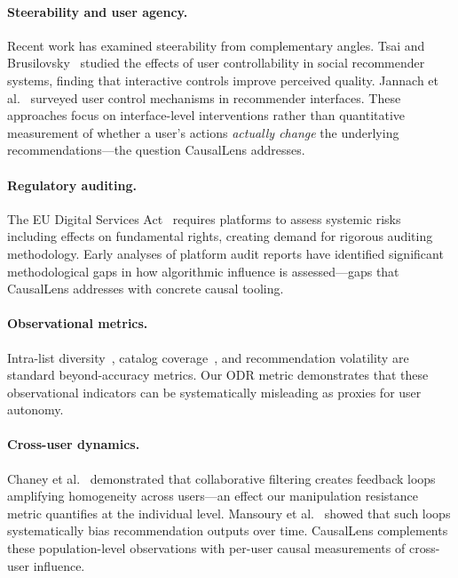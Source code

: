 \documentclass[sigconf,anonymous]{acmart}
\begin{document}
\paragraph{Steerability and user agency.}
Recent work has examined steerability from complementary angles. Tsai and Brusilovsky~\cite{tsai2021controllability} studied the effects of user controllability in social recommender systems, finding that interactive controls improve perceived quality. Jannach et al.~\cite{jannach2017user} surveyed user control mechanisms in recommender interfaces. These approaches focus on interface-level interventions rather than quantitative measurement of whether a user's actions \emph{actually change} the underlying recommendations---the question CausalLens addresses.

\paragraph{Regulatory auditing.}
The EU Digital Services Act~\cite{eu_dsa2022} requires platforms to assess systemic risks including effects on fundamental rights, creating demand for rigorous auditing methodology. Early analyses of platform audit reports have identified significant methodological gaps in how algorithmic influence is assessed---gaps that CausalLens addresses with concrete causal tooling.

\paragraph{Observational metrics.}
Intra-list diversity~\cite{zhang2008avoiding}, catalog coverage~\cite{ge2010beyond}, and recommendation volatility are standard beyond-accuracy metrics. Our ODR metric demonstrates that these observational indicators can be systematically misleading as proxies for user autonomy.

\paragraph{Cross-user dynamics.}
Chaney et al.~\cite{chaney2018algorithmic} demonstrated that collaborative filtering creates feedback loops amplifying homogeneity across users---an effect our manipulation resistance metric quantifies at the individual level. Mansoury et al.~\cite{mansoury2020feedback} showed that such loops systematically bias recommendation outputs over time. CausalLens complements these population-level observations with per-user causal measurements of cross-user influence.
\end{document}
